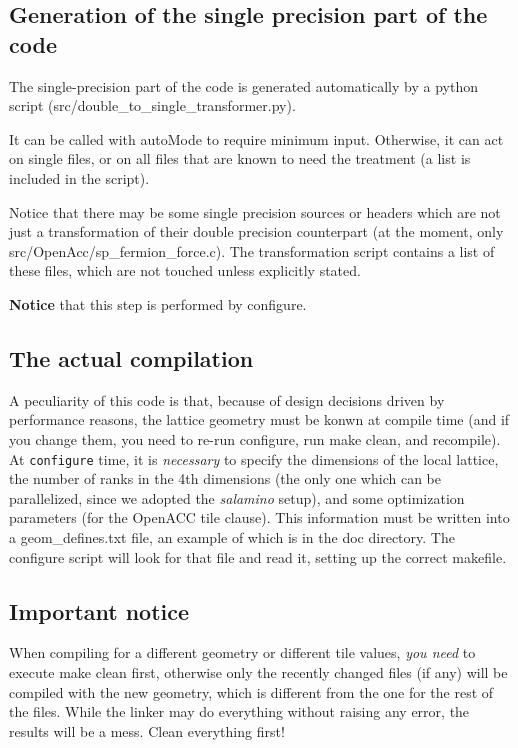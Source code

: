\subsection{Generation of the single precision part of the code}
The single-precision part of the code is generated automatically 
by a python script ({\sf src/double\_to\_single\_transformer.py}).

It can be called with {\sf autoMode} to require minimum input. Otherwise, it can act on
single files, or on all files that are known to need the treatment (a list is included in the script).

Notice that there may be some single precision sources or headers which are not just a 
transformation of their double precision counterpart (at the moment, only 
{\sf src/OpenAcc/sp\_fermion\_force.c}). The transformation script contains a list
of these files, which are not touched unless explicitly stated.

{\bf Notice} that this step is performed by {\sf configure}.


\subsection{The actual compilation}

A peculiarity of this code is that, because of design decisions driven by 
performance reasons, the lattice geometry must be konwn at compile time (and 
if you change them, you need to re-run {\sf configure}, run {\sf make clean}, and recompile). 
At \verb|configure| time, it is \emph{necessary} to  specify the dimensions of the local lattice,
the number of ranks in the 4th dimensions (the only one which can be 
parallelized, since we adopted the \emph{salamino} setup), and some optimization parameters
(for the OpenACC  {\sf tile} clause). This information must be written into a 
{\sf geom\_defines.txt} file, an example of which is in the {\sf doc} directory.
The {\sf configure} script will look for that file and read it, setting up the correct makefile.

\subsection{Important notice}

When compiling for a different geometry or different {\sf tile values}, \emph{you need} to execute 
{\sf make clean} first, otherwise only the recently changed files  (if 
any) will be 
compiled with the new geometry, which is different from the one for the rest of 
the files. While the linker may do everything without raising any error, the results will be a 
mess. Clean everything first!\\

